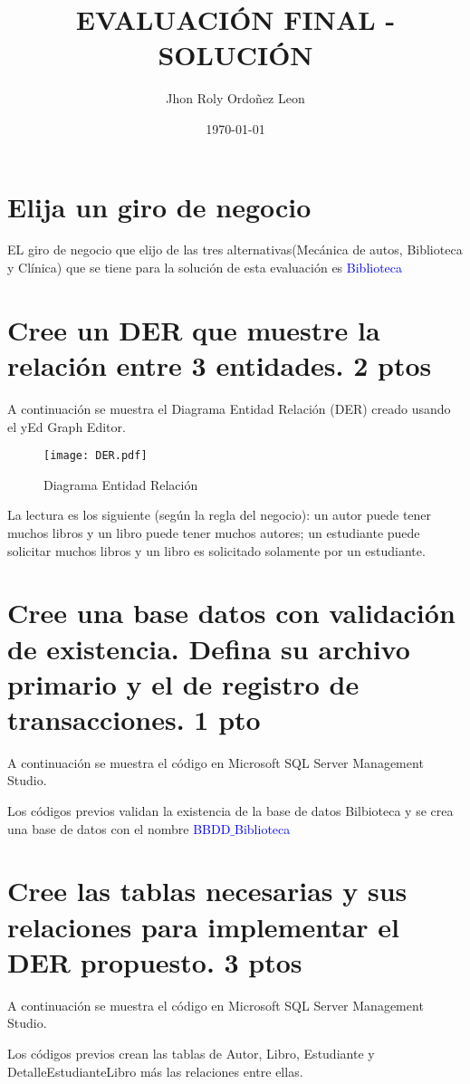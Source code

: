\documentclass[11pt]{article}
\title{EVALUACIÓN FINAL - SOLUCIÓN}
\author{Jhon Roly Ordoñez Leon}
\date{\today}
\begin{document}
	\maketitle
	
	\section*{Elija un giro de negocio}
	
	EL giro de negocio que elijo de las tres alternativas(Mecánica de autos, Biblioteca y Clínica) que se tiene  para la solución de esta evaluación es \textcolor{blue}{Biblioteca} 
	
	\section*{Cree un DER que muestre la relación entre 3 entidades. 2 ptos}
	
	A continuación se muestra el Diagrama Entidad Relación (DER) creado usando el yEd Graph Editor.
		\begin{figure}[H]
			\centering
			\texttt{[image: DER.pdf]}
			\caption{Diagrama Entidad Relación}
		\end{figure}
	La lectura es los siguiente (según la regla del negocio): un autor puede tener muchos libros y un libro puede tener muchos autores; un estudiante puede solicitar muchos libros y un libro es solicitado solamente por un estudiante.
	\section*{Cree una base datos con validación de existencia. Defina su archivo primario y el de registro de transacciones. 1 pto}
	
	A continuación se muestra el código en Microsoft SQL Server Management Studio.
		
	Los códigos previos validan la existencia de la base de datos Bilbioteca y se crea una base de datos con el nombre \textcolor{blue}{BBDD$\_$Biblioteca}
	
	\section*{Cree las tablas necesarias y sus relaciones para implementar el DER propuesto. 3 ptos}
	
	A continuación se muestra el código en Microsoft SQL Server Management Studio.
		
	Los códigos previos crean las tablas de Autor, Libro, Estudiante y DetalleEstudianteLibro más las relaciones entre ellas.
\end{document}
